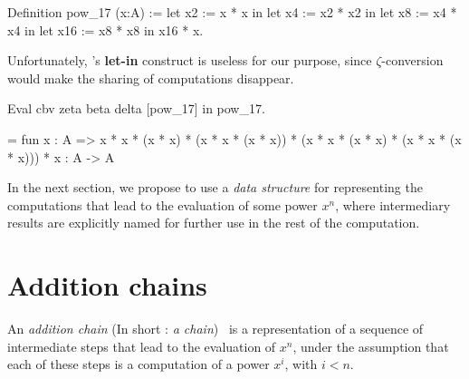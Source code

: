 \begin{Coqsrc}
Definition pow_17  (x:A) :=
  let x2 := x * x in
  let x4 := x2 * x2 in
  let x8 := x4 * x4 in
  let x16 := x8 * x8 in
  x16 * x.
\end{Coqsrc}
\label{pow-17-let-in}

Unfortunately, \coq's \textbf{let-in} construct is useless for our purpose, since $\zeta$-conversion 
would make the sharing of computations disappear.

\begin{Coqsrc}
Eval cbv  zeta beta delta [pow_17]  in  pow_17.
\end{Coqsrc}

\begin{Coqanswer}
 = fun x : A =>
       x * x * (x * x) * (x * x * (x * x)) *
       (x * x * (x * x) * (x * x * (x * x))) * x
     : A -> A 
\end{Coqanswer}
                                                                                                                                                                                                                                                                                                                                                                                                                                                                                                                                                                                                                                                                                                                                                                                                                                   
In the next section, we propose to use a \emph{data structure} for representing 
the computations that lead to the evaluation of some power $x^n$, where
intermediary results are explicitly named for further use in the rest of the computation.




\section{Addition chains}
An \emph{addition chain} (In short : \emph{a chain})~\cite{brauer1939} is a representation of a sequence of
intermediate steps that lead to the evaluation of  $x^n$, under the 
assumption that each of these steps is a computation of  a power $x^i$, with 
$i<n$.

